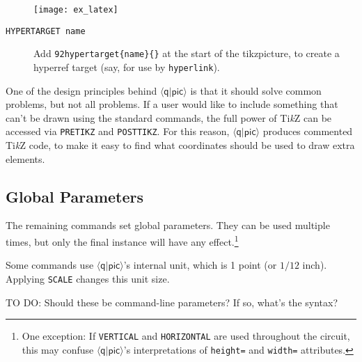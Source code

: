 \documentclass[twoside,12pt]{article}
\newcommand{\qpic}{$\langle\mathsf{q}|\mathsf{pic}\rangle$\xspace}
\newcommand{\TikZ}{Ti\emph{k}Z\xspace}
\begin{document}
\begin{description}
\begin{minipage}[b]{3.5in}

\end{minipage} \hfill \texttt{[image: ex\_latex]}

\item[{\tt HYPERTARGET name}] Add {\tt \char92hypertarget\{name\}\{\}} at the start of
  the tikzpicture, to create a hyperref target (say, for use by {\tt hyperlink}).

\begin{minipage}[b]{3.5in}

\end{minipage} \hfill 

\end{description}

One of the design principles behind \qpic is that it should solve common problems, but not all
problems.  If a user would like to include something that can't be drawn using the standard
commands, the full power of \TikZ can be accessed via {\tt PRETIKZ} and {\tt POSTTIKZ}.  For this
reason, \qpic produces commented \TikZ code, to make it easy to find what coordinates should be
used to draw extra elements.


\subsection{Global Parameters}
\label{sec-parameters}

The remaining commands set global parameters.  They can be used multiple times, but only
the final instance will have any effect.\footnote{One exception:  If {\tt VERTICAL} and {\tt HORIZONTAL}
are used throughout the circuit, this may confuse \qpic's interpretations of {\tt height=}
and {\tt width=} attributes.}

Some commands use \qpic's internal unit, which is 1 point (or $1/12$ inch).  Applying
{\tt SCALE} changes this unit size.

TO DO: Should these be command-line parameters?  If so, what's the syntax?
\end{document}
